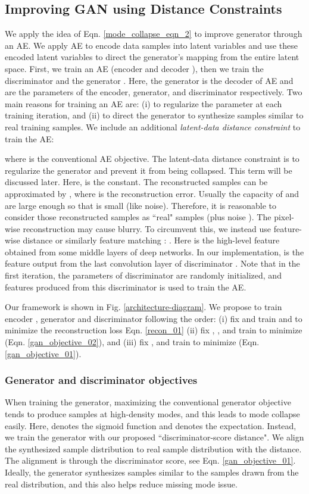 \documentclass[runningheads]{llncs}
\begin{document}
\subsection{Improving GAN using Distance Constraints}
We apply the idea of Eqn. \ref{mode_collapse_eqn_2} to improve generator through an AE. We apply AE to encode data samples into latent variables and use these encoded latent variables to direct the generator's mapping from the entire latent space. First, we train an  AE (encoder  and decoder ), then we   train the discriminator  and the generator . Here, the generator is the decoder of AE and  are the parameters of the encoder, generator, and discriminator respectively. Two main reasons for training an AE are: (i) to regularize the parameter  at each training iteration, and (ii) to direct the generator to synthesize samples similar to real training samples. 
We include an additional {\em latent-data distance constraint} to train the AE:

where  is the conventional AE objective.
The latent-data distance constraint  is to regularize the generator and prevent it from being collapsed. This term will be discussed later. Here,  is the constant. The reconstructed samples  can be approximated by , where  is the reconstruction error. Usually the capacity of  and  are large enough so that  is small (like noise). Therefore, it is reasonable to consider those reconstructed samples as ``real" samples (plus noise ). The pixel-wise reconstruction may cause blurry. To circumvent this, we instead use feature-wise distance \cite{larsen-arxiv-2015} or similarly feature matching \cite{salimans-nisp-2016}:  . Here
 is the high-level feature obtained from some middle layers of deep networks. In our implementation,  is the feature output from the last convolution layer of discriminator . Note that in the first iteration, the parameters of discriminator are randomly initialized, and features produced from this discriminator is used to train the AE. 

Our framework is shown in Fig. \ref{architecture-diagram}.  We propose to train encoder , generator  and discriminator  following the order: (i) fix  and train  and  to minimize the reconstruction loss Eqn. \ref{recon_01} (ii) fix , , and train  to minimize (Eqn. \ref{gan_objective_02}), and (iii) fix ,  and train  to minimize (Eqn. \ref{gan_objective_01}).
\subsubsection{Generator and discriminator objectives}
When training the generator, maximizing the conventional generator objective  \cite{goodfellow-nisp-2014} tends to produce samples at high-density modes, and this leads to mode collapse easily. Here,  denotes the sigmoid function and  denotes the expectation. Instead, we train the generator with our proposed ``discriminator-score distance". We align the  synthesized sample distribution to real sample distribution with the  distance.  The alignment is through the discriminator score, see Eqn. \ref{gan_objective_01}. Ideally, the generator synthesizes samples similar to the samples drawn from the real distribution, and this also helps reduce missing mode issue.
\end{document}

